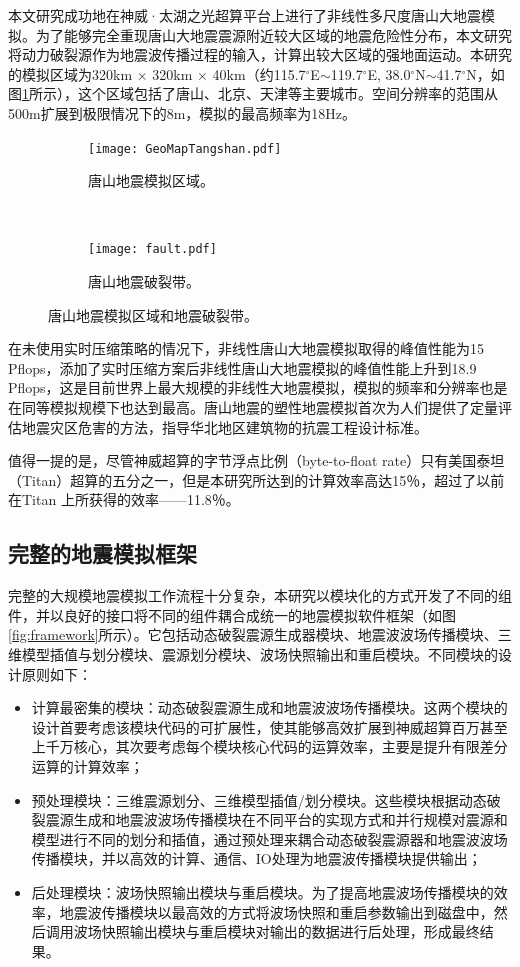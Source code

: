 本文研究成功地在神威·太湖之光超算平台上进行了非线性多尺度唐山大地震模拟。为了能够完全重现唐山大地震震源附近较大区域的地震危险性分布，本文研究将动力破裂源作为地震波传播过程的输入，计算出较大区域的强地面运动。本研究的模拟区域为320km $\times$ 320km $\times$ 40km（约115.7$^\circ$E$\sim$119.7$^\circ$E, 38.0$^\circ$N$\sim$41.7$^\circ$N，如图\ref{fig:tangshan_region}所示），这个区域包括了唐山、北京、天津等主要城市。空间分辨率的范围从500m扩展到极限情况下的8m，模拟的最高频率为18Hz。

\begin{figure}[ht]
    \centering
    \begin{subfigure}[b]{0.5\textwidth}
        \centering
        \texttt{[image: GeoMapTangshan.pdf]}
        \caption{唐山地震模拟区域。}
    \end{subfigure}%
    ~
    \begin{subfigure}[b]{0.5\textwidth}
        \centering
        \texttt{[image: fault.pdf]}
        \caption{唐山地震破裂带。}
    \end{subfigure}
    \caption{唐山地震模拟区域和地震破裂带。}
    \label{fig:tangshan_region}
\end{figure}


在未使用实时压缩策略的情况下，非线性唐山大地震模拟取得的峰值性能为15 Pflops，添加了实时压缩方案后非线性唐山大地震模拟的峰值性能上升到18.9 Pflops，这是目前世界上最大规模的非线性大地震模拟，模拟的频率和分辨率也是在同等模拟规模下也达到最高。唐山地震的塑性地震模拟首次为人们提供了定量评估地震灾区危害的方法，指导华北地区建筑物的抗震工程设计标准。

值得一提的是，尽管神威超算的字节浮点比例（byte-to-float rate）只有美国泰坦（Titan）超算的五分之一，但是本研究所达到的计算效率高达15％，超过了以前在Titan \citep{roten2016high}上所获得的效率——11.8％。

\subsection{完整的地震模拟框架}
完整的大规模地震模拟工作流程十分复杂，本研究以模块化的方式开发了不同的组件，并以良好的接口将不同的组件耦合成统一的地震模拟软件框架（如图\ref{fig:framework}所示）。它包括动态破裂震源生成器模块、地震波波场传播模块、三维模型插值与划分模块、震源划分模块、波场快照输出和重启模块。不同模块的设计原则如下：
\begin{itemize}
  \item 计算最密集的模块：动态破裂震源生成和地震波波场传播模块。这两个模块的设计首要考虑该模块代码的可扩展性，使其能够高效扩展到神威超算百万甚至上千万核心，其次要考虑每个模块核心代码的运算效率，主要是提升有限差分运算的计算效率；
  \item 预处理模块：三维震源划分、三维模型插值/划分模块。这些模块根据动态破裂震源生成和地震波波场传播模块在不同平台的实现方式和并行规模对震源和模型进行不同的划分和插值，通过预处理来耦合动态破裂震源器和地震波波场传播模块，并以高效的计算、通信、IO处理为地震波传播模块提供输出；
  \item 后处理模块：波场快照输出模块与重启模块。为了提高地震波场传播模块的效率，地震波传播模块以最高效的方式将波场快照和重启参数输出到磁盘中，然后调用波场快照输出模块与重启模块对输出的数据进行后处理，形成最终结果。
\end{itemize}

